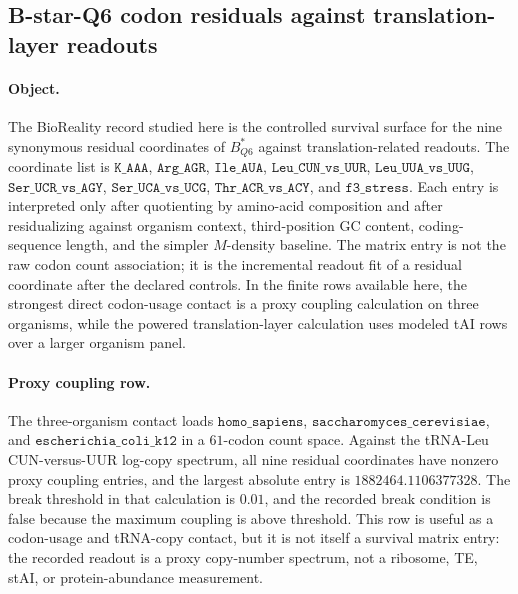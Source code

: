 \subsection{B-star-Q6 codon residuals against translation-layer readouts}\label{sec:bioreality-b-star-q6-translation-survival}

\paragraph{Object.}
The BioReality record studied here is the controlled survival surface for the nine synonymous residual coordinates of $B^{\ast}_{Q6}$ against translation-related readouts.  The coordinate list is
$\texttt{K\_AAA}$, $\texttt{Arg\_AGR}$, $\texttt{Ile\_AUA}$, $\texttt{Leu\_CUN\_vs\_UUR}$, $\texttt{Leu\_UUA\_vs\_UUG}$, $\texttt{Ser\_UCR\_vs\_AGY}$, $\texttt{Ser\_UCA\_vs\_UCG}$, $\texttt{Thr\_ACR\_vs\_ACY}$, and $\texttt{f3\_stress}$.  Each entry is interpreted only after quotienting by amino-acid composition and after residualizing against organism context, third-position GC content, coding-sequence length, and the simpler $M$-density baseline.  The matrix entry is not the raw codon count association; it is the incremental readout fit of a residual coordinate after the declared controls.  In the finite rows available here, the strongest direct codon-usage contact is a proxy coupling calculation on three organisms, while the powered translation-layer calculation uses modeled tAI rows over a larger organism panel.

\paragraph{Proxy coupling row.}
The three-organism contact loads $\texttt{homo\_sapiens}$, $\texttt{saccharomyces\_cerevisiae}$, and $\texttt{escherichia\_coli\_k12}$ in a $61$-codon count space.  Against the tRNA-Leu CUN-versus-UUR log-copy spectrum, all nine residual coordinates have nonzero proxy coupling entries, and the largest absolute entry is $1882464.1106377328$.  The break threshold in that calculation is $0.01$, and the recorded break condition is false because the maximum coupling is above threshold.  This row is useful as a codon-usage and tRNA-copy contact, but it is not itself a survival matrix entry: the recorded readout is a proxy copy-number spectrum, not a ribosome, TE, stAI, or protein-abundance measurement.

